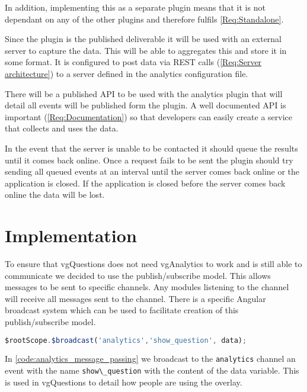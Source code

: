 In addition, implementing this as a separate plugin means that it is not dependant on any of the other plugins and therefore fulfils \cref{Req:Standalone}.

Since the plugin is the published deliverable it will be used with an external server to capture the data. This will be able to aggregates this and store it in some format. It is configured to post data via \gls{REST} calls (\cref{Req:Server architecture}) to a server defined in the analytics configuration file.

There will be a published \gls{API} to be used with the analytics plugin that will detail all events will be published form the plugin. A well documented API is important (\cref{Req:Documentation}) so that developers can easily create a service that collects and uses the data.

In the event that the server is unable to be contacted it should queue the results until it comes back online. Once a request fails to be sent the plugin should try sending all queued events at an interval until the server comes back online or the application is closed. If the application is closed before the server comes back online the data will be lost.

\section{Implementation}

To ensure that vgQuestions does not need vgAnalytics to work and is still able to communicate we decided to use the publish/subscribe model. This allows messages to be sent to specific channels. Any modules listening to the channel will receive all messages sent to the channel. There is a specific Angular broadcast system which can be used to facilitate creation of this publish/subscribe model.

\begin{lstlisting}[language=javascript,caption={AngularJS demonstrating the message passing interface used in the Analytics plugin},label={code:analytics_message_passing}]
$rootScope.$broadcast('analytics','show_question', data);
\end{lstlisting}

In \autoref{code:analytics_message_passing} we broadcast to the \lstinline|analytics| channel an event with the name
\lstinline|show\_question| with the content of the data variable. This is used in \gls{vgQuestions} to detail how people are using the overlay.

